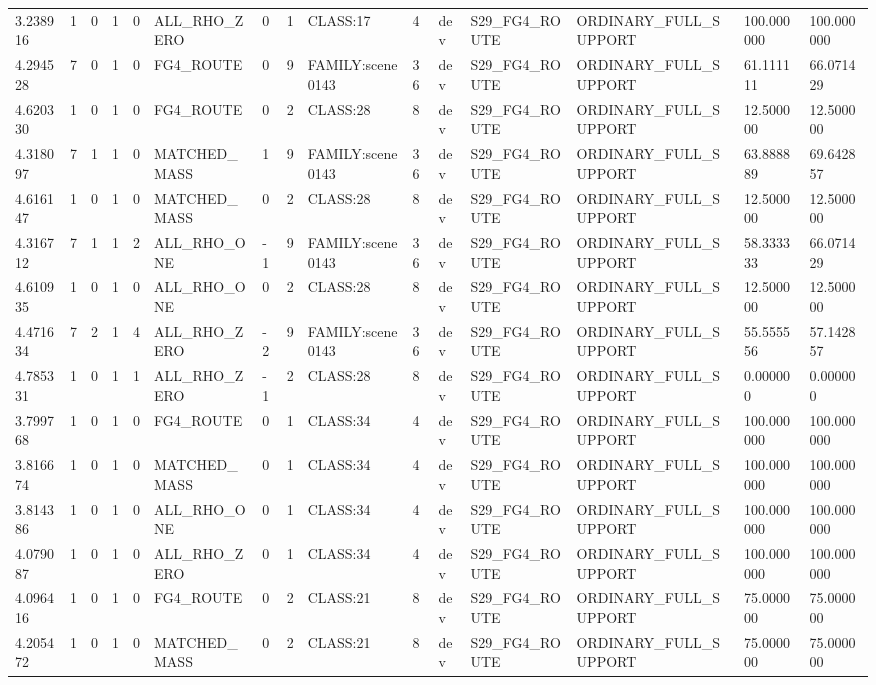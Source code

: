 \begin{tabular}{lllllllllllllll}
3.238916 & 1 & 0 & 1 & 0 & ALL\_RHO\_ZERO & 0 & 1 & CLASS:17 & 4 & dev & S29\_FG4\_ROUTE & ORDINARY\_FULL\_SUPPORT & 100.000000 & 100.000000 \\
4.294528 & 7 & 0 & 1 & 0 & FG4\_ROUTE & 0 & 9 & FAMILY:scene0143 & 36 & dev & S29\_FG4\_ROUTE & ORDINARY\_FULL\_SUPPORT & 61.111111 & 66.071429 \\
4.620330 & 1 & 0 & 1 & 0 & FG4\_ROUTE & 0 & 2 & CLASS:28 & 8 & dev & S29\_FG4\_ROUTE & ORDINARY\_FULL\_SUPPORT & 12.500000 & 12.500000 \\
4.318097 & 7 & 1 & 1 & 0 & MATCHED\_MASS & 1 & 9 & FAMILY:scene0143 & 36 & dev & S29\_FG4\_ROUTE & ORDINARY\_FULL\_SUPPORT & 63.888889 & 69.642857 \\
4.616147 & 1 & 0 & 1 & 0 & MATCHED\_MASS & 0 & 2 & CLASS:28 & 8 & dev & S29\_FG4\_ROUTE & ORDINARY\_FULL\_SUPPORT & 12.500000 & 12.500000 \\
4.316712 & 7 & 1 & 1 & 2 & ALL\_RHO\_ONE & -1 & 9 & FAMILY:scene0143 & 36 & dev & S29\_FG4\_ROUTE & ORDINARY\_FULL\_SUPPORT & 58.333333 & 66.071429 \\
4.610935 & 1 & 0 & 1 & 0 & ALL\_RHO\_ONE & 0 & 2 & CLASS:28 & 8 & dev & S29\_FG4\_ROUTE & ORDINARY\_FULL\_SUPPORT & 12.500000 & 12.500000 \\
4.471634 & 7 & 2 & 1 & 4 & ALL\_RHO\_ZERO & -2 & 9 & FAMILY:scene0143 & 36 & dev & S29\_FG4\_ROUTE & ORDINARY\_FULL\_SUPPORT & 55.555556 & 57.142857 \\
4.785331 & 1 & 0 & 1 & 1 & ALL\_RHO\_ZERO & -1 & 2 & CLASS:28 & 8 & dev & S29\_FG4\_ROUTE & ORDINARY\_FULL\_SUPPORT & 0.000000 & 0.000000 \\
3.799768 & 1 & 0 & 1 & 0 & FG4\_ROUTE & 0 & 1 & CLASS:34 & 4 & dev & S29\_FG4\_ROUTE & ORDINARY\_FULL\_SUPPORT & 100.000000 & 100.000000 \\
3.816674 & 1 & 0 & 1 & 0 & MATCHED\_MASS & 0 & 1 & CLASS:34 & 4 & dev & S29\_FG4\_ROUTE & ORDINARY\_FULL\_SUPPORT & 100.000000 & 100.000000 \\
3.814386 & 1 & 0 & 1 & 0 & ALL\_RHO\_ONE & 0 & 1 & CLASS:34 & 4 & dev & S29\_FG4\_ROUTE & ORDINARY\_FULL\_SUPPORT & 100.000000 & 100.000000 \\
4.079087 & 1 & 0 & 1 & 0 & ALL\_RHO\_ZERO & 0 & 1 & CLASS:34 & 4 & dev & S29\_FG4\_ROUTE & ORDINARY\_FULL\_SUPPORT & 100.000000 & 100.000000 \\
4.096416 & 1 & 0 & 1 & 0 & FG4\_ROUTE & 0 & 2 & CLASS:21 & 8 & dev & S29\_FG4\_ROUTE & ORDINARY\_FULL\_SUPPORT & 75.000000 & 75.000000 \\
4.205472 & 1 & 0 & 1 & 0 & MATCHED\_MASS & 0 & 2 & CLASS:21 & 8 & dev & S29\_FG4\_ROUTE & ORDINARY\_FULL\_SUPPORT & 75.000000 & 75.000000 \\

\end{tabular}

